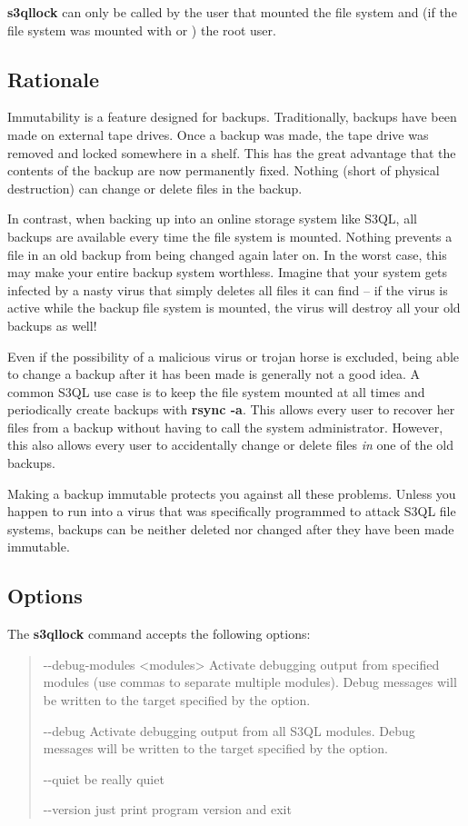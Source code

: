 \documentclass[letterpaper,10pt,english]{sphinxmanual}
\begin{document}
\textbf{s3qllock} can only be called by the user that mounted the file system
and (if the file system was mounted with  or
) the root user.


\subsection{Rationale}
\label{man/lock:rationale}
Immutability is a feature designed for backups. Traditionally, backups
have been made on external tape drives. Once a backup was made, the
tape drive was removed and locked somewhere in a shelf. This has the
great advantage that the contents of the backup are now permanently
fixed. Nothing (short of physical destruction) can change or delete
files in the backup.

In contrast, when backing up into an online storage system like S3QL,
all backups are available every time the file system is mounted.
Nothing prevents a file in an old backup from being changed again
later on. In the worst case, this may make your entire backup system
worthless. Imagine that your system gets infected by a nasty virus
that simply deletes all files it can find -- if the virus is active
while the backup file system is mounted, the virus will destroy all
your old backups as well!

Even if the possibility of a malicious virus or trojan horse is
excluded, being able to change a backup after it has been made is
generally not a good idea. A common S3QL use case is to keep the file
system mounted at all times and periodically create backups with
\textbf{rsync -a}. This allows every user to recover her files from a
backup without having to call the system administrator. However, this
also allows every user to accidentally change or delete files \emph{in} one
of the old backups.

Making a backup immutable protects you against all these problems.
Unless you happen to run into a virus that was specifically programmed
to attack S3QL file systems, backups can be neither deleted nor
changed after they have been made immutable.


\subsection{Options}
\label{man/lock:options}
The \textbf{s3qllock} command accepts the following options:
\begin{quote}
\begin{optionlist}{3cm}
\item [-{-}debug-modules \textless{}modules\textgreater{}]  
Activate debugging output from specified modules (use
commas to separate multiple modules). Debug messages
will be written to the target specified by the
 option.
\item [-{-}debug]  
Activate debugging output from all S3QL modules. Debug
messages will be written to the target specified by
the  option.
\item [-{-}quiet]  
be really quiet
\item [-{-}version]  
just print program version and exit
\end{optionlist}
\end{quote}
\end{document}
